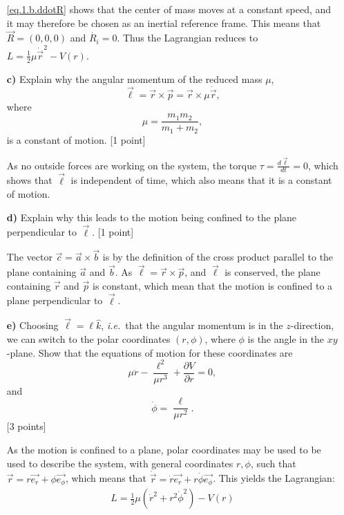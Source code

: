 \documentclass[11pt,a4paper]{report}
\newcounter{excount}[chapter]
\newenvironment{exercise}[1][]{\addtocounter{excount}{1} \noindent {\bf Question
    \arabic{excount} \ \ #1}\hspace{2mm}}{\vspace{4mm}}
\begin{document}
\begin{exercise}{\bf Central potentials\\}
\begin{itemize}
\eqref{eq.1.b.ddotR} shows that the center of mass moves at a constant speed, and it may therefore be chosen as an inertial reference frame. This means that $\vec{R}=(0,0,0)$ and $\dot{R_i}=0$. Thus the Lagrangian reduces to $L=\frac{1}{2}\mu \dot{\vec{r}}^2-V(r)$.

\item[{\bf c)}] Explain why the angular momentum of the reduced mass $\mu$,
\begin{equation}
\vec\ell = \vec r \times \vec p= \vec r \times \mu\dot{\vec r},
\end{equation}
where
\begin{equation}
\mu= \frac{m_1m_2}{m_1+m_2},
\end{equation}
is a constant of motion.
[1 point] \par 
As no outside forces are working on the system, the torque $\tau=\frac{d \vec{\ell}}{dt}=0$, which shows that $\vec{\ell}$ is independent of time, which also means that it is a constant of motion.


\item[{\bf d)}] Explain why this leads to the motion being confined to the plane perpendicular to $\vec\ell$. [1 point]

The vector $\vec{c}=\vec{a} \times \vec{b}$ is by the definition of the cross product parallel to the plane containing $\vec{a}$ and $\vec{b}$. As $\vec\ell = \vec r \times \vec p$, and $\vec \ell$ is conserved, the plane containing $\vec{r}$ and $\vec{p}$ is constant, which mean that the motion is confined to a plane perpendicular to $\vec{\ell}$.



\item[{\bf e)}] Choosing $\vec\ell= \ell\hat k$, {\it i.e.}\ that the angular momentum is in the $z$-direction, we can switch to the polar coordinates $(r,\phi)$, where $\phi$ is the angle in the $xy$-plane. Show that the equations of motion for these coordinates are
\begin{equation}
\mu\ddot r-\frac{\ell^2}{\mu r^3}+\frac{\partial V}{\partial r}=0,\label{eq:LEQ_r}
\end{equation}
and
\begin{equation}
\dot\phi=\frac{\ell}{\mu r^2}\label{eq:LEQ_phi}.
\end{equation}
[3 points] \par


As the motion is confined to a plane, polar coordinates may be used to be used to describe the system, with general coordinates $r, \phi$, such that $\vec{r}=r \vec{e_r}+\phi \vec{e_\phi}$, which means that $\dot{\vec{r}}=\dot{r} \vec{e_r}+ r \dot{\phi} \vec{e_\phi}$. This yields the Lagrangian:
\begin{align}
L=\frac{1}{2}\mu (\dot{r}^2+r^2\dot{\phi}^2)-V(r) \label{eq:1.e.L}
\end{align} 


\end{itemize}
\end{exercise}
\end{document}
